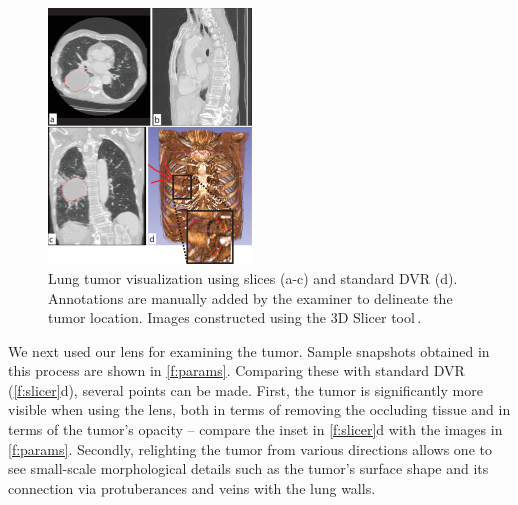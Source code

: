 \begin{figure}[htb]
\includegraphics [width=0.48\textwidth]{images/slicer.eps}
\caption{Lung tumor visualization using slices (a-c) and standard DVR (d). Annotations are manually added by the examiner to delineate the tumor location. Images constructed using the 3D Slicer tool\,\cite{slicer}.}
\label{f:slicer}
\end{figure}

We next used our lens for examining the tumor. Sample snapshots obtained in this process are shown in \autoref{f:params}. Comparing these with standard DVR (\autoref{f:slicer}d), several points can be made. First, the tumor is significantly more visible when using the lens, both in terms of removing the occluding tissue and in terms of the tumor's opacity -- compare the inset in \autoref{f:slicer}d with the images in \autoref{f:params}. Secondly, relighting the tumor from various directions allows one to see small-scale morphological details such as the tumor's surface shape and its connection via protuberances and veins with the lung walls.

